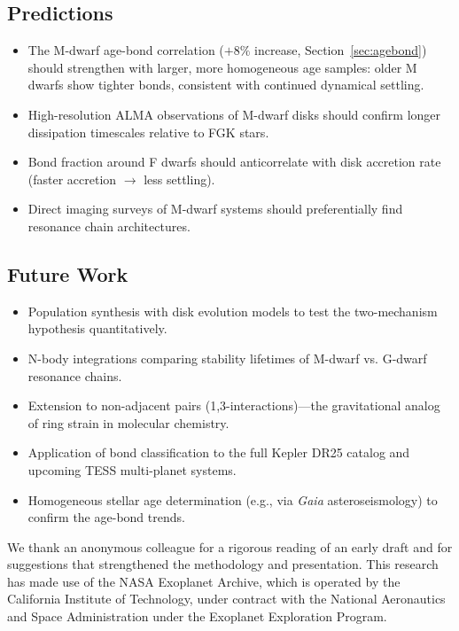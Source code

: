 \documentclass[twocolumn]{aastex631}
\begin{document}
\subsection{Predictions}
\begin{itemize}
  \item The M-dwarf age-bond correlation ($+8\%$ increase, Section~\ref{sec:agebond}) should strengthen with larger, more homogeneous age samples: older M dwarfs show tighter bonds, consistent with continued dynamical settling.
  \item High-resolution ALMA observations of M-dwarf disks should confirm
        longer dissipation timescales relative to FGK stars.
  \item Bond fraction around F dwarfs should anticorrelate with disk accretion
        rate (faster accretion $\rightarrow$ less settling).
  \item Direct imaging surveys of M-dwarf systems should preferentially find
        resonance chain architectures.
\end{itemize}

\subsection{Future Work}
\begin{itemize}
  \item Population synthesis with disk evolution models to test the
        two-mechanism hypothesis quantitatively.
  \item N-body integrations comparing stability lifetimes of M-dwarf vs.
        G-dwarf resonance chains.
  \item Extension to non-adjacent pairs (1,3-interactions)---the gravitational
        analog of ring strain in molecular chemistry.
  \item Application of bond classification to the full Kepler DR25 catalog and
        upcoming TESS multi-planet systems.
  \item Homogeneous stellar age determination (e.g., via \textit{Gaia} asteroseismology)
        to confirm the age-bond trends.
\end{itemize}

\begin{acknowledgments}
We thank an anonymous colleague for a rigorous reading of an early draft and
for suggestions that strengthened the methodology and presentation.
This research has made use of the NASA Exoplanet Archive, which is operated by
the California Institute of Technology, under contract with the National
Aeronautics and Space Administration under the Exoplanet Exploration Program.
\end{acknowledgments}



\end{document}
